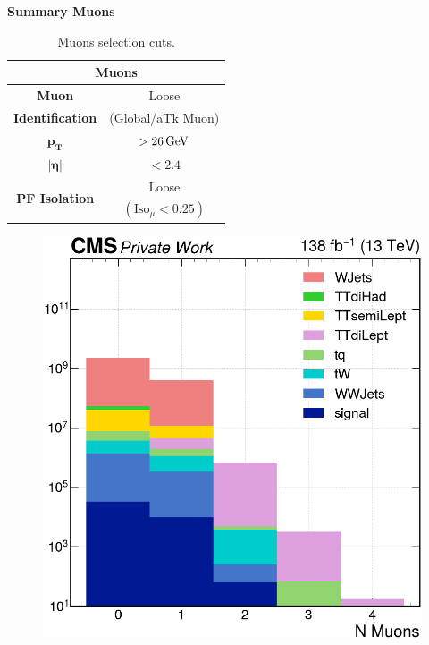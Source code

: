 \newpage
\begin{center}
    \vspace{1cm}
    \fontsize{14}{14}\selectfont
    \textbf{Summary Muons}
\end{center}
\begin{minipage}{\linewidth}
\begin{minipage}{0.46\linewidth}
\vspace{-1.25cm}
        \begin{table}[H]
        \centering
        \begin{tabular}{c|c}
            \toprule
            \multicolumn{2}{c}{\textbf{Muons}}\\
            \midrule
            \midrule
            \textbf{Muon} & Loose\\
            \textbf{Identification}& (Global/aTk Muon)\\
            \midrule
            $\mathbf{p_T}$& $>26 {\,\text{Ge\hspace{-.08em}V}}$\\
            \midrule
            $\bm{|\eta|}$& $<2.4$ \\
            \midrule
            \multirow{2}{*}{\textbf{PF Isolation}}&Loose\\
            &$(\text{Iso}_\mu<0.25)$\\
            \bottomrule
        \end{tabular}
        \caption{Muons selection cuts.}
    \end{table}
\end{minipage}
\hfill
\begin{minipage}{0.53\linewidth}
      \begin{figure}[H]
            \centering
            \includegraphics[width=1\linewidth]{fig//chap07-selection/nMuons.png}

\end{figure}
\end{minipage}
\end{minipage}
